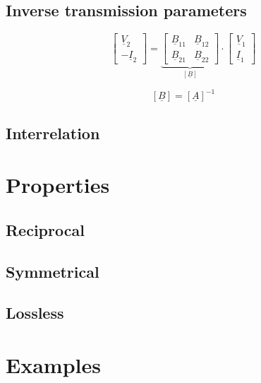 \documentclass{article}[11pt]
\begin{document}
\subsection{Inverse transmission parameters}


\begin{equation}
\begin{bmatrix}
 \underline{V}_{\mathrm{2}} \\
-\underline{I}_{\mathrm{2}} 
\end{bmatrix}
=
\underbrace{
\begin{bmatrix}
\underline{B}_{\mathrm{11}} & \underline{B}_{\mathrm{12}} \\
\underline{B}_{\mathrm{21}} & \underline{B}_{\mathrm{22}}
\end{bmatrix}
}_{\left[\underline{B}\right]}
\cdot
\begin{bmatrix}
\underline{V}_{\mathrm{1}} \\
\underline{I}_{\mathrm{1}} 
\end{bmatrix}
\end{equation}

\begin{equation}
\left[\underline{B}\right] = \left[\underline{A}\right]^{-1}
\end{equation}

\begin{landscape}
\section{Interrelation}
\end{landscape}

\section{Properties}

\subsection{Reciprocal}
\subsection{Symmetrical}
\subsection{Lossless}

\section{Examples}
\end{document}
